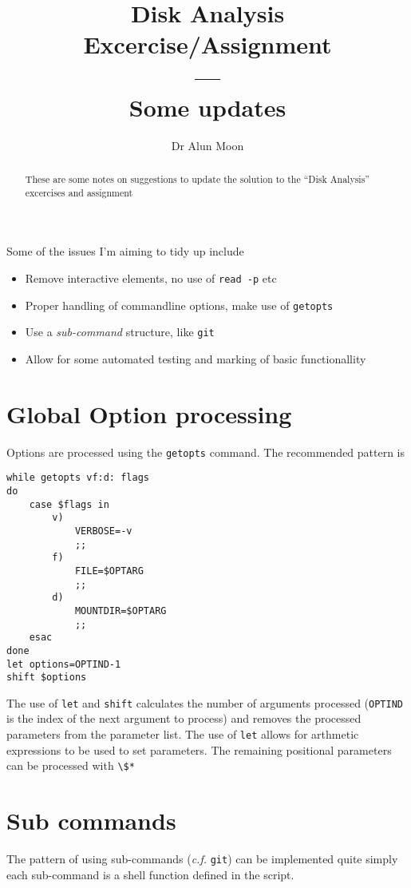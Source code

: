 \documentclass[12pt]{article}
\title{Disk Analysis Excercise/Assignment \\---\\ Some updates}
\author{Dr Alun Moon}
\begin{document}
\maketitle

\begin{abstract}
	These are some notes on suggestions to update the solution to the 
	``Disk Analysis'' excercises and assignment
\end{abstract}

Some of the issues I'm aiming to tidy up include
\begin{itemize}
	\item Remove interactive elements, no use of \verb:read -p: etc
	\item Proper handling of commandline options, make use of \verb:getopts:
	\item Use a \emph{sub-command} structure, like \verb:git:
	\item Allow for some automated testing and marking of basic functionallity
\end{itemize}

\section{Global Option processing}
Options are processed using the \verb:getopts: command.  The recommended pattern is 
\begin{tcolorbox}[title=\texttt{getopts} handling]
\begin{verbatim}
while getopts vf:d: flags
do
    case $flags in
        v)
            VERBOSE=-v
            ;;
        f)
            FILE=$OPTARG
            ;;
        d)
            MOUNTDIR=$OPTARG
            ;;
    esac
done
let options=OPTIND-1
shift $options
\end{verbatim}
\end{tcolorbox}
The use of \verb:let: and \verb:shift: calculates the number of arguments processed 
(\verb:OPTIND: is the index of the next argument to process)
and removes the processed parameters from the parameter list.
The use of \verb:let: allows for arthmetic expressions to be used to set parameters.
The remaining positional parameters can be processed with \verb:\$*:

\section{Sub commands}
The pattern of using sub-commands (\textit{c.f.} \verb:git:) can be implemented quite simply
each sub-command is a shell function defined in the script.
\end{document}
